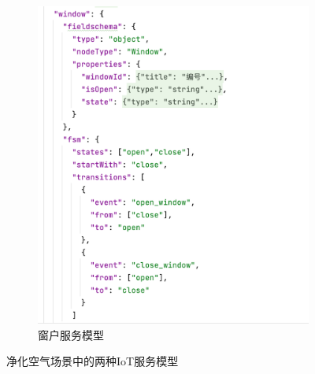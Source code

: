 \documentclass[winfonts,master,twoside]{njuthesis}
\begin{document}
\begin{figure}[H]
\begin{subfigure}{.5\textwidth}
		\includegraphics[width=1.0\textwidth]{figure/5-experiment/window-model.png}
		\caption{窗户服务模型}
		\label{subfig:b}
	\end{subfigure}
\caption{净化空气场景中的两种IoT服务模型}
\label{fig:sub}
\end{figure}
\end{document}
